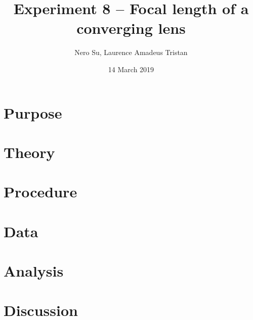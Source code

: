 \documentclass[letter]{article}
\title{Experiment 8 -- Focal length of a converging lens}
\author{Nero Su, Laurence Amadeus Tristan}
\date{14 March 2019}
\numberwithin{equation}{section}
\numberwithin{figure}{section}
\numberwithin{table}{section}
\begin{document}
\maketitle
\section{Purpose}

\section{Theory}

\section{Procedure}

\section{Data}

\section{Analysis}

\section{Discussion}
\end{document}
